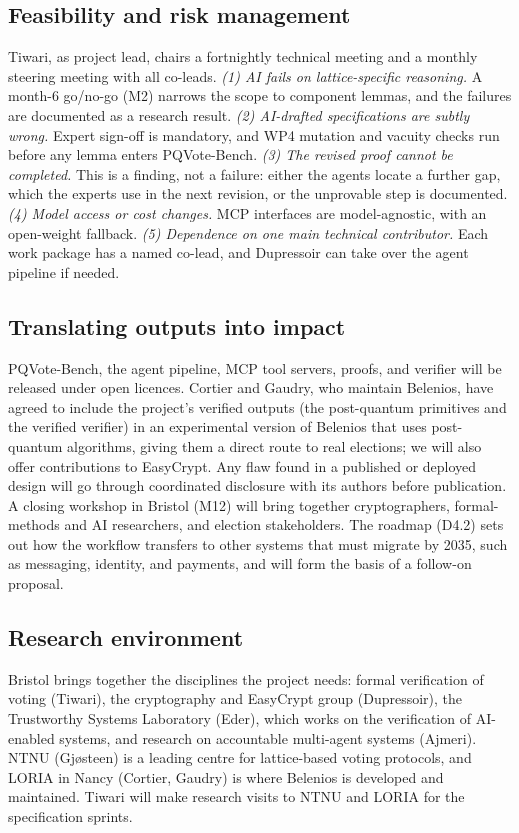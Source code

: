 \documentclass[11pt]{article}
\begin{document}
\subsection{Feasibility and risk management}
Tiwari, as project lead, chairs a fortnightly technical meeting and a monthly steering meeting with all co-leads.
\emph{(1) AI fails on lattice-specific reasoning.} A month-6 go/no-go (M2) narrows the scope to component lemmas,
and the failures are documented as a research result. \emph{(2) AI-drafted specifications are subtly wrong.} Expert
sign-off is mandatory, and WP4 mutation and vacuity checks run before any lemma enters PQVote-Bench. \emph{(3) The
revised proof cannot be completed.} This is a finding, not a failure: either the agents locate a further gap, which
the experts use in the next revision, or the unprovable step is documented. \emph{(4) Model access or cost changes.} MCP interfaces are
model-agnostic, with an open-weight fallback. \emph{(5) Dependence on one main technical contributor.} Each work package
has a named co-lead, and Dupressoir can take over the agent pipeline if needed.

\subsection{Translating outputs into impact}
PQVote-Bench, the agent pipeline, MCP tool servers, proofs, and verifier will be released under open licences.
Cortier and Gaudry, who maintain Belenios, have agreed to include the project's verified outputs (the post-quantum
primitives and the verified verifier) in an experimental version of Belenios that uses post-quantum algorithms, giving them a direct route to real
elections; we will also offer contributions to EasyCrypt. Any flaw found in a published
or deployed design will go through coordinated disclosure with its authors before publication. A closing workshop in
Bristol (M12) will bring together cryptographers, formal-methods and AI researchers, and election stakeholders. The
roadmap (D4.2) sets out how the workflow transfers to other systems that must migrate by 2035, such as messaging,
identity, and payments, and will form the basis of a follow-on proposal.

\subsection{Research environment}
Bristol brings together the disciplines the project needs: formal verification of voting (Tiwari), the
cryptography and EasyCrypt group (Dupressoir), the Trustworthy Systems Laboratory (Eder), which works on the
verification of AI-enabled systems, and research on accountable multi-agent systems (Ajmeri). NTNU (Gj{\o}steen) is a leading centre for lattice-based voting protocols, and
LORIA in Nancy (Cortier, Gaudry) is where Belenios is developed and maintained. Tiwari will make research visits to
NTNU and LORIA for the specification sprints.
\end{document}
